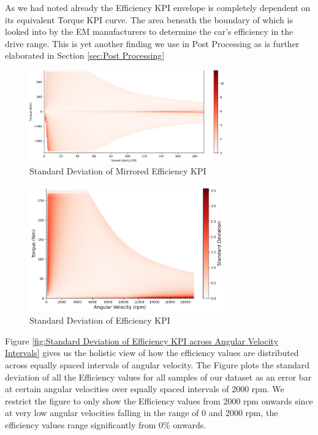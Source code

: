 \documentclass{report} %
\begin{document}
As we had noted already the Efficiency \ac{KPI} envelope is completely dependent on its equivalent Torque \ac{KPI} curve. 
The area beneath the boundary of which is looked into by the \ac{EM} manufacturers to determine the car's efficiency in the drive range.
This is yet another finding we use in Post Processing as is further elaborated in Section \ref{sec:Post Processing}

\begin{figure}[H]
    \centering
    \includegraphics[width=0.75\textwidth]{./ReportImages/stddev_y2.png} 
    \caption{Standard Deviation of Mirrored Efficiency \ac{KPI}} 
    \label{fig:Standard Deviation of Efficiency KPI(Mirrored Map)}
\end{figure}

\begin{figure}[H]
    \centering
    \includegraphics[width=0.75\textwidth]{./ReportImages/pos_stddev_y2.png} 
    \caption{Standard Deviation of Efficiency \ac{KPI}} 
    \label{fig:Standard Deviation of Efficiency KPI}
\end{figure}

Figure \ref{fig:Standard Deviation of Efficiency KPI across Angular Velocity Intervals} gives us the holistic view of how the efficiency values are 
distributed across equally spaced intervals of angular velocity. The Figure plots the standard deviation of all the Efficiency values for all samples of our dataset 
as an error bar at certain angular velocities over equally spaced intervals of 2000 rpm.
We restrict the figure to only show the Efficiency values from 2000 rpm onwards since at very low angular velocities falling in the range of 0 and 2000 rpm, the efficiency 
values range significantly from 0\% onwards.
\end{document}
